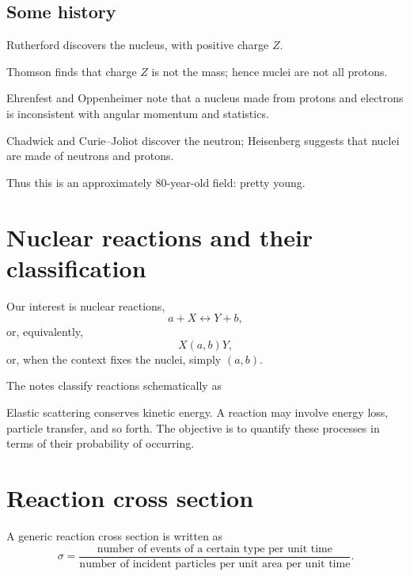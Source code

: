 \subsection*{Some history}
\begin{description}[style=multiline,leftmargin=4em,labelwidth=3.2em]
  \item[1911] Rutherford discovers the nucleus, with positive charge $Z$.
  \item[1913] Thomson finds that charge $Z$ is not the mass; hence nuclei are not all protons.
  \item[1931] Ehrenfest and Oppenheimer note that a nucleus made from protons and electrons is inconsistent with angular momentum and statistics.  
  \item[1932] Chadwick and Curie--Joliot discover the neutron; Heisenberg suggests that nuclei are made of neutrons and protons.
\end{description}
Thus this is an approximately 80-year-old field: pretty young.

\section{Nuclear reactions and their classification}
Our interest is nuclear reactions,
\[
  a+X \longleftrightarrow Y+b,
\]
or, equivalently,
\[
  X(a,b)Y,
\]
or, when the context fixes the nuclei, simply $(a,b)$.

The notes classify reactions schematically as
\begin{center}
\end{center}
Elastic scattering conserves kinetic energy.  A reaction may involve energy loss, particle transfer, and so forth.  The objective is to quantify these processes in terms of their probability of occurring.

\section{Reaction cross section}
A generic reaction cross section is written as
\[
  \sigma
  =\frac{\text{number of events of a certain type per unit time}}
  {\text{number of incident particles per unit area per unit time}}.
\]

